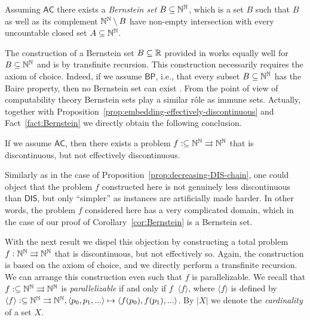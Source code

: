 \documentclass{amsart}
\def\IN{{\Bbb{N}}}
\def\IR{{\Bbb{R}}}
\def\In{\subseteq}
\def\mto{\rightrightarrows}
\def\equivW{\mathop{\equiv_{\mathrm{W}}}}
\def\equivW{\mathop{\equiv_{\mathrm{W}}}}
\def\DIS{\mathsf{DIS}}
\def\AC{\mathsf{AC}}
\def\BP{\mathsf{BP}}
\begin{document}
\begin{fact}
\label{fact:Bernstein}
Assuming $\AC$ there exists a {\em Bernstein set} $B\In\IN^\IN$, which is a set $B$ such that $B$ as well as its complement $\IN^\IN\setminus B$ have non-empty intersection 
with every uncountable closed set $A\In\IN^\IN$. 
\end{fact}

The construction of a Bernstein set $B\In\IR$ provided in \cite[Exercise~8.24]{Kec95} works equally well for $B\In\IN^\IN$
and is by transfinite recursion. 
This construction necessarily requires the axiom of choice.
Indeed, if we assume $\BP$, i.e., that every subset $B\In\IN^\IN$ has the Baire property,
then no Bernstein set can exist \cite{Kec95}.
From the point of view of computability theory Bernstein sets play a similar r\^{o}le as immune sets.
Actually, together with Proposition~\ref{prop:embedding-effectively-discontinuous} and Fact~\ref{fact:Bernstein}
we directly obtain the following conclusion.

\begin{corollary}
\label{cor:Bernstein}
If we assume $\AC$, then there exists a problem $f:\In\IN^\IN\mto\IN^\IN$
that is discontinuous, but not effectively discontinuous.
\end{corollary}

Similarly as in the case of Proposition~\ref{prop:decreasing-DIS-chain}, one could object that the problem $f$ constructed here
is not genuinely less discontinuous than $\DIS$, but only ``simpler'' as instances are artificially made harder.
In other words, the problem $f$ considered here has a very complicated domain, which in the case of our proof of Corollary~\ref{cor:Bernstein}
is a Bernstein set.

With the next result we dispel this objection by constructing a total problem $f:\IN^\IN\mto\IN^\IN$
that is discontinuous, but not effectively so. Again, the construction is based on the axiom of choice,
and we directly perform a transfinite recursion.
We can arrange this construction even such that $f$ is parallelizable.
We recall that $f:\In\IN^\IN\mto\IN^\IN$ is {\em parallelizable} if and only if  $f\equivW\langle f\rangle$,
where $\langle f\rangle$ is defined by $\langle f\rangle:\In\IN^\IN\mto\IN^\IN,\langle p_0,p_1,...\rangle\mapsto\langle f(p_0),f(p_1),...\rangle$. 
By $|X|$ we denote the {\em cardinality} of a set $X$.
\end{document}
